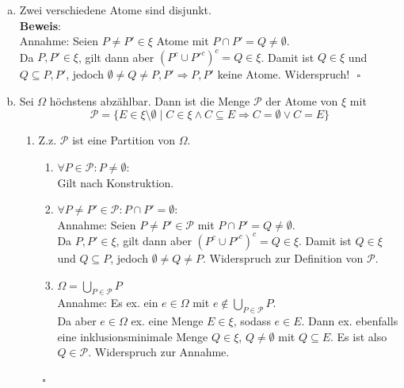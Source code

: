 \documentclass[11pt,a4paper,ngerman]{article}
\begin{document}
\begin{enumerate}[a)]
\item Zwei verschiedene Atome sind disjunkt. \\
	\textbf{Beweis}: \\
Annahme: Seien $P \neq P' \in \xi$ Atome mit $P \cap P' = Q \neq \emptyset$.\\
 Da $P, P' \in \xi$, gilt dann aber $(P^c \cup P'^c)^c = Q \in \xi$.
Damit ist $Q \in\xi$ und $Q \subseteq P,P'$, jedoch $\emptyset \neq Q \neq P,P' \Rightarrow P,P'$ keine Atome. Widerspruch!
 $\mbox{}$ \hfill $\square$

\item Sei $\Omega$ höchstens abzählbar. Dann ist die Menge $\mathcal{P}$ der Atome von $\xi$ mit
\begin{equation*}\mathcal{P} = \{ E \in \xi \setminus \emptyset \; | \; C \in \xi \land C \subseteq E \Rightarrow C = \emptyset \lor C = E  \} \end{equation*}
\begin{enumerate}[(1)]



\item Z.z. $\mathcal{P}$ ist eine Partition von $\Omega$.

\begin{enumerate}[(1)]
\item $\forall P \in \mathcal{P}: P \neq \emptyset$: \\
Gilt nach Konstruktion.

\item $\forall P \neq P' \in \mathcal{P}: P \cap P' = \emptyset$: \\
Annahme: Seien $P \neq P' \in \mathcal{P}$ mit $P \cap P' = Q \neq \emptyset$.\\
 Da $P, P' \in \xi$, gilt dann aber $(P^c \cup P'^c)^c = Q \in \xi$.
Damit ist $Q \in\xi$ und $Q \subseteq P$, jedoch $\emptyset \neq Q \neq P$. Widerspruch zur Definition von $\mathcal{P}$.

\item $\Omega = \bigcup_{P \in \mathcal{P}} P $ \\
Annahme: Es ex. ein $e \in \Omega$ mit $e \notin  \bigcup_{P \in \mathcal{P}} P$. \\
Da aber $e \in \Omega$ ex. eine Menge $E \in \xi$, sodass $e  \in E$. Dann ex. ebenfalls eine inklusionsminimale Menge $Q \in \xi$, $Q \neq \emptyset$ mit $Q \subseteq E$.
Es ist also $Q \in \mathcal{P}$. Widerspruch zur Annahme. \\
\end{enumerate}
 $\mbox{}$ \hfill $\square$



\end{enumerate}
\end{enumerate}
\end{document}
